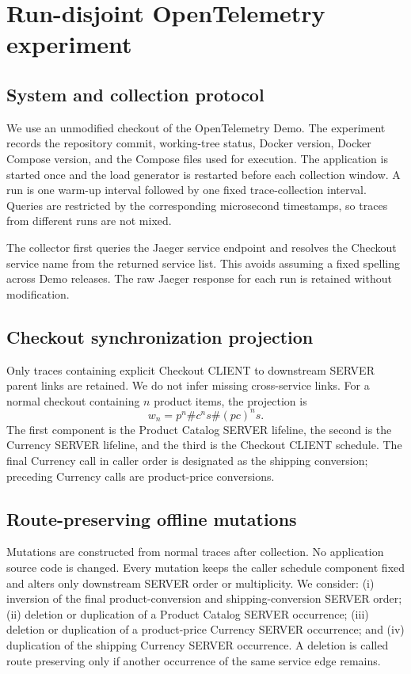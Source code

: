 \section{Run-disjoint OpenTelemetry experiment}
\label{sec:v11-experiment}

\subsection{System and collection protocol}

We use an unmodified checkout of the OpenTelemetry Demo.  The experiment records
the repository commit, working-tree status, Docker version, Docker Compose
version, and the Compose files used for execution.  The application is started
once and the load generator is restarted before each collection window.  A run
is one warm-up interval followed by one fixed trace-collection interval.
Queries are restricted by the corresponding microsecond timestamps, so traces
from different runs are not mixed.

The collector first queries the Jaeger service endpoint and resolves the
Checkout service name from the returned service list.  This avoids assuming a
fixed spelling across Demo releases.  The raw Jaeger response for each run is
retained without modification.

\subsection{Checkout synchronization projection}

Only traces containing explicit Checkout CLIENT to downstream SERVER parent
links are retained.  We do not infer missing cross-service links.  For a normal
checkout containing $n$ product items, the projection is
\[
  w_n=p^n\#c^n s\#(pc)^n s.
\]
The first component is the Product Catalog SERVER lifeline, the second is the
Currency SERVER lifeline, and the third is the Checkout CLIENT schedule.
The final Currency call in caller order is designated as the shipping
conversion; preceding Currency calls are product-price conversions.

\subsection{Route-preserving offline mutations}

Mutations are constructed from normal traces after collection.  No application
source code is changed.  Every mutation keeps the caller schedule component
fixed and alters only downstream SERVER order or multiplicity.  We consider:
(i) inversion of the final product-conversion and shipping-conversion SERVER
order; (ii) deletion or duplication of a Product Catalog SERVER occurrence;
(iii) deletion or duplication of a product-price Currency SERVER occurrence;
and (iv) duplication of the shipping Currency SERVER occurrence.  A deletion is
called route preserving only if another occurrence of the same service edge
remains.

